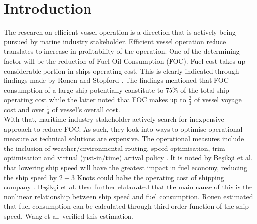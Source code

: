 \section{Introduction} \label{introduction}

The research on efficient vessel operation is a direction that is actively being pursued by marine industry stakeholder. Efficient vessel operation reduce  translates to increase in profitability of the operation. One of the determining factor will be the reduction of Fuel Oil Consumption (FOC). Fuel cost takes up considerable portion in ships operating cost. This is clearly indicated through findings made by Ronen \cite{Ronen.2011} and Stopford \cite{Stopford.2009}. The findings mentioned that FOC consumption of a large ship potentially constitute to 75\% of the total ship operating cost while the latter noted that FOC makes up to \(\frac{2}{3}\) of vessel voyage cost and over \(\frac{1}{4}\) of vessel's overall cost. \\

With that, maritime industry stakeholder actively search for inexpensive approach to reduce FOC. As such, they look into ways to optimise operational measure as technical solutions are expensive. The operational measures include the inclusion of weather/environmental routing, speed optimisation, trim optimisation and virtual (just-in/time) arrival policy \cite{Li.2022}. It is noted by {Be{\c{s}}ik{\c{c}}i} et al. \cite{BalBesikci.2016} that lowering ship speed will have the greatest impact in fuel economy, reducing the ship speed by $2-3$ Knots could halve the operating cost of shipping company \cite{Stopford.2009,Wijnolst.2009}. {Be{\c{s}}ik{\c{c}}i} et al. then further elaborated that the main cause of this is the nonlinear relationship between ship speed and fuel consumption. Ronen \cite{Ronen.1982} estimated that fuel consumption can be calculated through third order function of the ship speed. Wang et al. \cite{Wang.2012} verified this estimation.\\







